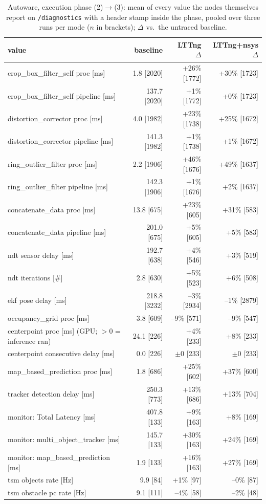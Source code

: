 \begin{table}[t]\centering\scriptsize
\caption{Autoware, execution phase (2)$\rightarrow$(3): mean of every value the nodes themselves report on \texttt{/diagnostics} with a header stamp inside the phase, pooled over three runs per mode ($n$ in brackets); $\Delta$ vs.\ the untraced baseline.}
\label{tab:aw-phase-execution}
\begin{tabular}{lrrr}
\toprule
value & baseline & LTTng $\Delta$ & LTTng+nsys $\Delta$ \\
\midrule
crop\_box\_filter\_self proc [ms] & 1.8 [2020] & +26\% [1772] & +30\% [1723] \\
crop\_box\_filter\_self pipeline [ms] & 137.7 [2020] & +1\% [1772] & +0\% [1723] \\
distortion\_corrector proc [ms] & 4.0 [1982] & +23\% [1738] & +25\% [1672] \\
distortion\_corrector pipeline [ms] & 141.3 [1982] & +1\% [1738] & +1\% [1672] \\
ring\_outlier\_filter proc [ms] & 2.2 [1906] & +46\% [1676] & +49\% [1637] \\
ring\_outlier\_filter pipeline [ms] & 142.3 [1906] & +1\% [1676] & +2\% [1637] \\
concatenate\_data proc [ms] & 13.8 [675] & +23\% [605] & +31\% [583] \\
concatenate\_data pipeline [ms] & 201.0 [675] & +5\% [605] & +5\% [583] \\
ndt sensor delay [ms] & 192.7 [638] & +4\% [546] & +3\% [519] \\
ndt iterations [\#] & 2.8 [630] & +5\% [523] & +6\% [508] \\
ekf pose delay [ms] & 218.8 [3232] & --3\% [2934] & --1\% [2879] \\
occupancy\_grid proc [ms] & 3.8 [609] & --9\% [571] & --9\% [547] \\
centerpoint proc [ms] (GPU; $>$0 = inference ran) & 24.1 [226] & +4\% [233] & +8\% [233] \\
centerpoint consecutive delay [ms] & 0.0 [226] & $\pm$0 [233] & $\pm$0 [233] \\
map\_based\_prediction proc [ms] & 1.8 [686] & +25\% [602] & +37\% [600] \\
tracker detection delay [ms] & 250.3 [773] & +13\% [686] & +13\% [704] \\
monitor: Total Latency [ms] & 407.8 [133] & +9\% [163] & +8\% [169] \\
monitor: multi\_object\_tracker [ms] & 145.7 [133] & +30\% [163] & +24\% [169] \\
monitor: map\_based\_prediction [ms] & 1.9 [133] & +16\% [163] & +27\% [169] \\
tsm objects rate [Hz] & 9.9 [84] & +1\% [97] & --0\% [87] \\
tsm obstacle pc rate [Hz] & 9.1 [111] & --4\% [58] & --2\% [48] \\
\bottomrule
\end{tabular}
\end{table}
